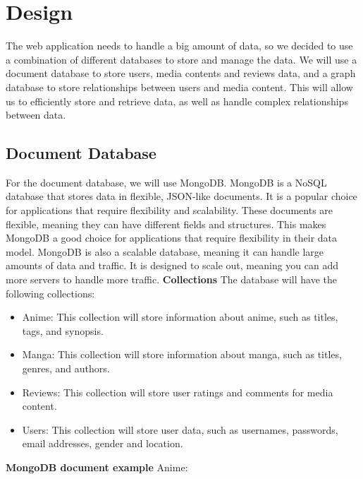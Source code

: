 \chapter{Design}
The web application needs to handle a big amount of data, so we decided to use a combination of different databases to store and manage the data. 
We will use a document database to store users, media contents and reviews data, and a graph database to store relationships between users and media content. 
This will allow us to efficiently store and retrieve data, as well as handle complex relationships between data. 

\section{Document Database}
For the document database, we will use MongoDB. MongoDB is a NoSQL database that stores data in flexible, 
JSON-like documents. It is a popular choice for applications that require flexibility and scalability. 
These documents are 
flexible, meaning they can have different fields and structures. This makes MongoDB a good choice for 
applications that require flexibility in their data model. MongoDB is also a scalable database, meaning 
it can handle large amounts of data and traffic. It is designed to scale out, meaning you can add more 
servers to handle more traffic.
\newline
\newline
\textbf{Collections}
The database will have the following collections:
\begin{itemize}
    \item Anime: This collection will store information about anime, such as titles, tags, and synopsis.
    \item Manga: This collection will store information about manga, such as titles, genres, and authors.
    \item Reviews: This collection will store user ratings and comments for media content.
    \item Users: This collection will store user data, such as usernames, passwords, email addresses, gender and location.

\end{itemize}
\newpage
\textbf{MongoDB document example}
\newline
Anime:
